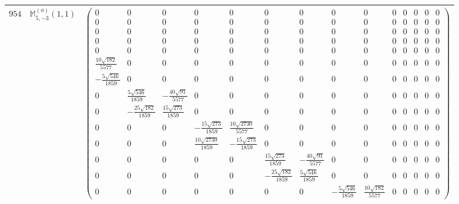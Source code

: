 \documentclass[fleqn,8pt,landscape]{jsarticle}
\begin{document}
\begin{center}
\begin{longtable}{ccc}
$ 954 $ & $ \mathbb{M}_{5,-3}^{(a)}(1,1) $ & $ \begin{pmatrix} 0 & 0 & 0 & 0 & 0 & 0 & 0 & 0 & 0 & 0 & 0 & 0 & 0 & 0 \\ 0 & 0 & 0 & 0 & 0 & 0 & 0 & 0 & 0 & 0 & 0 & 0 & 0 & 0 \\ 0 & 0 & 0 & 0 & 0 & 0 & 0 & 0 & 0 & 0 & 0 & 0 & 0 & 0 \\ 0 & 0 & 0 & 0 & 0 & 0 & 0 & 0 & 0 & 0 & 0 & 0 & 0 & 0 \\ 0 & 0 & 0 & 0 & 0 & 0 & 0 & 0 & 0 & 0 & 0 & 0 & 0 & 0 \\ \frac{10 \sqrt{182}}{5577} & 0 & 0 & 0 & 0 & 0 & 0 & 0 & 0 & 0 & 0 & 0 & 0 & 0 \\ - \frac{5 \sqrt{546}}{1859} & 0 & 0 & 0 & 0 & 0 & 0 & 0 & 0 & 0 & 0 & 0 & 0 & 0 \\ 0 & \frac{5 \sqrt{546}}{1859} & - \frac{40 \sqrt{91}}{5577} & 0 & 0 & 0 & 0 & 0 & 0 & 0 & 0 & 0 & 0 & 0 \\ 0 & - \frac{25 \sqrt{182}}{1859} & \frac{15 \sqrt{273}}{1859} & 0 & 0 & 0 & 0 & 0 & 0 & 0 & 0 & 0 & 0 & 0 \\ 0 & 0 & 0 & - \frac{15 \sqrt{273}}{1859} & \frac{10 \sqrt{2730}}{5577} & 0 & 0 & 0 & 0 & 0 & 0 & 0 & 0 & 0 \\ 0 & 0 & 0 & \frac{10 \sqrt{2730}}{1859} & - \frac{15 \sqrt{273}}{1859} & 0 & 0 & 0 & 0 & 0 & 0 & 0 & 0 & 0 \\ 0 & 0 & 0 & 0 & 0 & \frac{15 \sqrt{273}}{1859} & - \frac{40 \sqrt{91}}{5577} & 0 & 0 & 0 & 0 & 0 & 0 & 0 \\ 0 & 0 & 0 & 0 & 0 & - \frac{25 \sqrt{182}}{1859} & \frac{5 \sqrt{546}}{1859} & 0 & 0 & 0 & 0 & 0 & 0 & 0 \\ 0 & 0 & 0 & 0 & 0 & 0 & 0 & - \frac{5 \sqrt{546}}{1859} & \frac{10 \sqrt{182}}{5577} & 0 & 0 & 0 & 0 & 0 \end{pmatrix} $ \\ \hline

\end{longtable}
\end{center}
\end{document}
